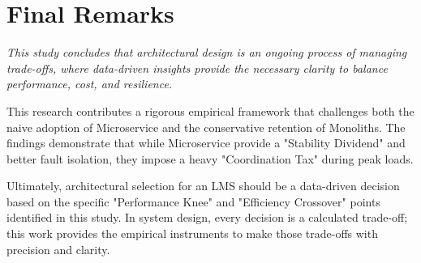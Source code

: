 \section{Final Remarks}
\textit{This study concludes that architectural design is an ongoing process of managing trade-offs, where data-driven insights provide the necessary clarity to balance performance, cost, and resilience.}

This research contributes a rigorous empirical framework that challenges both the naive adoption of Microservice and the conservative retention of Monoliths. The findings demonstrate that while Microservice provide a "Stability Dividend" and better fault isolation, they impose a heavy "Coordination Tax" during peak loads. 

Ultimately, architectural selection for an LMS should be a data-driven decision based on the specific "Performance Knee" and "Efficiency Crossover" points identified in this study. In system design, every decision is a calculated trade-off; this work provides the empirical instruments to make those trade-offs with precision and clarity.